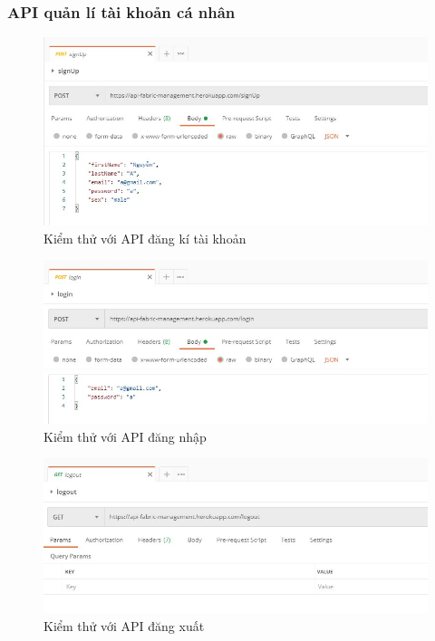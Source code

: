 \subsubsection{API quản lí tài khoản cá nhân}

\begin{figure}[H]
    \begin{center}
        \includegraphics[width=12cm]{Image/API/1_signup.jpg}
        \caption{Kiểm thử với API đăng kí tài khoản}
        \label{signup}
    \end{center}
\end{figure}
\begin{figure}[H]
    \begin{center}
        \includegraphics[width=12cm]{Image/API/2_login.jpg}
        \caption{Kiểm thử với API đăng nhập}
        \label{login}
    \end{center}
\end{figure}
\begin{figure}[H]
    \begin{center}
        \includegraphics[width=12cm]{Image/API/3_logout.jpg}
        \caption{Kiểm thử với API đăng xuất}
        \label{logout}
    \end{center}
\end{figure}
